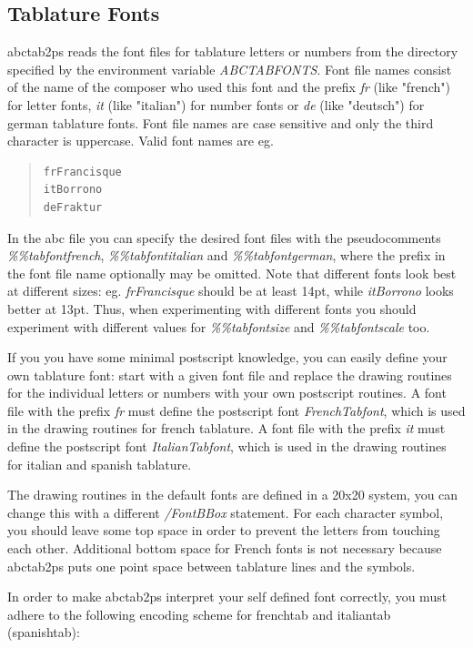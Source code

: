\documentclass[a4paper]{article}
\begin{document}
\subsection{Tablature Fonts}
\label{sec:TablatureFonts}
abctab2ps reads the font files for tablature letters or numbers
from the directory specified by the environment variable {\it ABCTABFONTS}.
Font file names consist of the name of the composer who used this font
and the prefix {\it fr} (like "french") for letter fonts, {\it it}
(like "italian") for number fonts or {\it de} (like "deutsch") for german
tablature fonts. Font file names are case
sensitive and only the third character is uppercase. Valid font
names are eg.
\begin{quote}
\begin{verbatim}
frFrancisque
itBorrono
deFraktur
\end{verbatim}
\end{quote}
In the abc file you can specify the desired font files with the
pseudocomments {\it \%\%tabfontfrench}, {\it \%\%tabfontitalian} and
{\it \%\%tabfontgerman}, where
the prefix in the font file name optionally may be omitted.
Note that different fonts look best at different sizes: eg.
{\it frFrancisque} should be at least 14pt, while {\it itBorrono}
looks better at 13pt. Thus, when experimenting with different fonts
you should experiment with different values for {\it \%\%tabfontsize}
and {\it \%\%tabfontscale} too.
\par
If you you have some minimal postscript knowledge, you can easily 
define your own tablature font: start with a given font file
and replace the drawing routines for the individual letters or
numbers with your own postscript routines. A font file with the
prefix {\it fr} must define the postscript font {\it FrenchTabfont},
which is used in the drawing routines for french tablature.
A font file with the prefix {\it it} must define the postscript font
{\it ItalianTabfont}, which is used in the drawing routines for
italian and spanish tablature.
\par
The drawing routines
in the default fonts are defined in a 20x20 system, you can change
this with a different {\it /FontBBox} statement. For each character
symbol, you should leave some top space in order to prevent the letters 
from touching each other. Additional bottom space for French fonts is not 
necessary because abctab2ps puts one point space between tablature lines
and the symbols.
\par
In order to make abctab2ps interpret your self defined font correctly,
you must adhere to the following encoding scheme for frenchtab and
italiantab (spanishtab):
\end{document}

